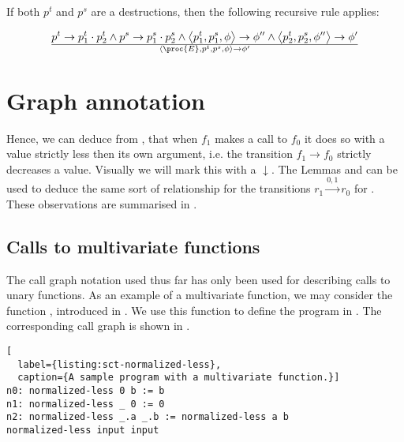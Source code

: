 If both $p^t$ and $p^s$ are a destructions, then the following recursive rule applies:

\begin{equation}
{
    p^t\rightarrow p^t_1\cdot p^t_2
  \wedge
    p^s\rightarrow p^s_1\cdot p^s_2
  \wedge
    \left\langle p^t_1, p^s_1, \phi\right\rangle
    \rightarrow
    \phi''
  \wedge
    \left\langle p^t_2, p^s_2, \phi''\right\rangle
    \rightarrow
    \phi'
}\over{
  \left\langle\proc{E},p^t,p^s,\phi\right\rangle
  \rightarrow
  \phi'
}
\end{equation}

\section{Graph annotation}

Hence, we can deduce from , that when $f_1$ makes a
call to $f_0$ it does so with a value strictly less then its own argument,
i.e. the transition $f_1\rightarrow f_0$ strictly decreases a value. Visually
we will mark this with a $\downarrow$. The Lemmas 
and  can be used to deduce the same sort of
relationship for the transitions $r_1\xrightarrow{0,1} r_0$ for
. These observations are summarised in
.



\subsection{Calls to multivariate functions}

The call graph notation used thus far has only been used for describing calls
to unary functions. As an example of a multivariate function, we may consider
the function , introduced in
. We use this function to define the program in
. The corresponding call graph is shown in
.

\begin{lstlisting}[
  label={listing:sct-normalized-less},
  caption={A sample program with a multivariate function.}]
n0: normalized-less 0 b := b
n1: normalized-less _ 0 := 0
n2: normalized-less _.a _.b := normalized-less a b
normalized-less input input
\end{lstlisting}



